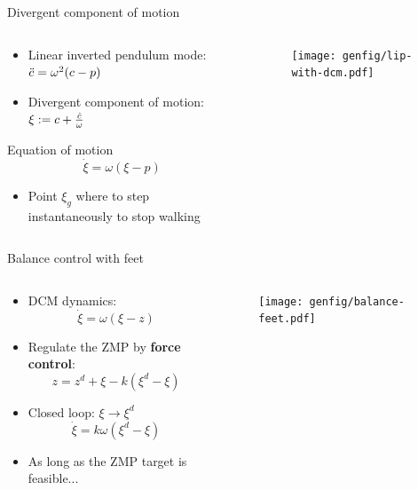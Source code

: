 \documentclass[9pt, aspectratio=43]{beamer}
\def\xid{\dot{\xi}}
\begin{document}
\begin{frame}{Divergent component of motion}
    \begin{columns}
        \begin{column}{0.55\textwidth}
            \begin{itemize}
                \item Linear inverted pendulum mode: $\ddot{c} = \omega^2 (c - p)$
                \item Divergent component of motion: $\xi := c + \frac{\dot{c}}{\omega}$
            \end{itemize}
            \begin{block}{Equation of motion}
                $$ \xid = \omega (\xi - p) $$
            \end{block}
            \begin{itemize}
                \item Point $\xi_g$ where to step instantaneously to stop walking
            \end{itemize}
        \end{column}
        \begin{column}{0.45\textwidth}
            \begin{figure}
                \centering
                \texttt{[image: genfig/lip-with-dcm.pdf]}
            \end{figure}
        \end{column}
    \end{columns}
\end{frame}

\begin{frame}{Balance control with feet}
    \begin{columns}
        \begin{column}{0.55\columnwidth}
            \begin{itemize}
                \item DCM dynamics:
                    $$ \xid = \omega (\xi - z) $$
                \item Regulate the ZMP by \textbf{force control}:
                    $$ z = z^d + \xi - k(\xi^d - \xi)$$
                \item Closed loop: $\xi \to \xi^d$
                    $$ \xid = k\omega (\xi^d - \xi) $$
                \item As long as the ZMP target is feasible...
            \end{itemize}
        \end{column}
        \begin{column}{0.45\columnwidth}
            \begin{figure}
                \centering
                \texttt{[image: genfig/balance-feet.pdf]}
            \end{figure}
        \end{column}
    \end{columns}
\end{frame}
\end{document}
